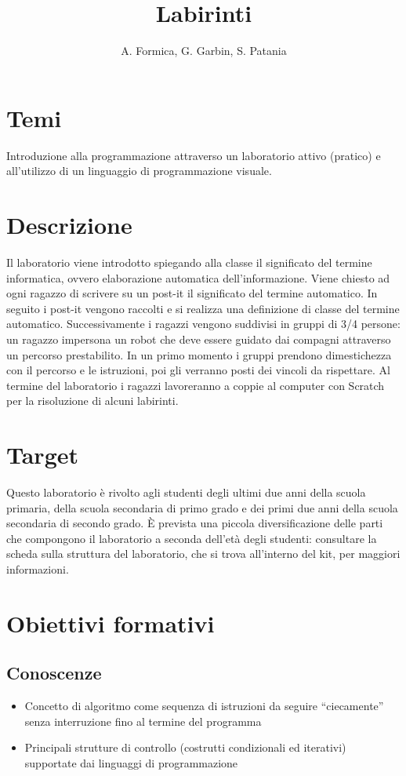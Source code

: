 \documentclass[12pt]{article}
\title{Labirinti}
\author{A. Formica, G. Garbin, S. Patania}
\begin{document}
\maketitle
%
% 
\section{Temi}
Introduzione alla programmazione attraverso un laboratorio attivo (pratico) e all’utilizzo di un linguaggio di programmazione visuale.
%
%
\section{Descrizione}
Il laboratorio viene introdotto spiegando alla classe il significato del termine informatica, ovvero elaborazione automatica dell’informazione. Viene chiesto ad ogni ragazzo di scrivere su un post-it il significato del termine automatico. In seguito i post-it vengono raccolti e si realizza una definizione di classe del termine automatico. Successivamente i ragazzi vengono suddivisi in gruppi di 3/4 persone: un ragazzo impersona un robot che deve essere guidato dai compagni attraverso un percorso prestabilito. In un primo momento i gruppi prendono dimestichezza con il percorso e le istruzioni, poi gli verranno posti dei vincoli da rispettare. Al termine del laboratorio i ragazzi lavoreranno a coppie al computer con Scratch per la risoluzione di alcuni labirinti.
%
%
\section{Target}
Questo laboratorio è rivolto agli studenti degli ultimi due anni della scuola primaria, della scuola secondaria di primo grado e dei primi due anni della scuola secondaria di secondo grado.
\`E prevista una piccola diversificazione delle parti che compongono il laboratorio a seconda dell'età degli studenti: consultare la scheda sulla struttura del laboratorio, che si trova all'interno del kit, per maggiori informazioni.
%
%
\section{Obiettivi formativi}
\subsection{Conoscenze}
\begin{itemize}
\item Concetto di algoritmo come sequenza di istruzioni da seguire “ciecamente” senza interruzione fino al termine del programma
\item Principali strutture di controllo (costrutti condizionali ed iterativi) supportate dai linguaggi di programmazione
\end{itemize}
\end{document}
